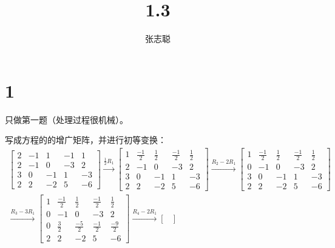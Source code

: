 \documentclass{article}
\begin{document}
\title{1.3}
\author{张志聪}
\maketitle

\section*{1}
只做第一题（处理过程很机械）。

写成方程的的增广矩阵，并进行初等变换：
\begin{align*}
  \begin{bmatrix}
    2 & -1 & 1  & -1 & 1  \\
    2 & -1 & 0  & -3 & 2  \\
    3 & 0  & -1 & 1  & -3 \\
    2 & 2  & -2 & 5  & -6
  \end{bmatrix}
  \xrightarrow{\frac{1}{2} R_1}
  \begin{bmatrix}
    1 & \frac{-1}{2} & \frac{1}{2} & \frac{-1}{2} & \frac{1}{2} \\
    2 & -1           & 0           & -3           & 2           \\
    3 & 0            & -1          & 1            & -3          \\
    2 & 2            & -2          & 5            & -6
  \end{bmatrix}
  \xrightarrow{R_2 - 2 R_1}
  \begin{bmatrix}
    1 & \frac{-1}{2} & \frac{1}{2} & \frac{-1}{2} & \frac{1}{2} \\
    0 & -1           & 0           & -3           & 2           \\
    3 & 0            & -1          & 1            & -3          \\
    2 & 2            & -2          & 5            & -6
  \end{bmatrix}   \\
  \xrightarrow{R_3 - 3 R_1}
  \begin{bmatrix}
    1 & \frac{-1}{2} & \frac{1}{2}  & \frac{-1}{2} & \frac{1}{2}  \\
    0 & -1           & 0            & -3           & 2            \\
    0 & \frac{3}{2}  & \frac{-5}{2} & \frac{-1}{2} & \frac{-9}{2} \\
    2 & 2            & -2           & 5            & -6
  \end{bmatrix}
  \xrightarrow{R_4 - 2 R_1}
  \begin{bmatrix}

\end{bmatrix}
\end{align*}
\end{document}
